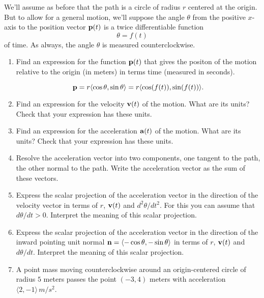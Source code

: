 \documentclass{ximera}
\begin{document}
\begin{question} \label{Q324234fgfg}
We'll assume as before that the path is a circle of radius $r$ centered at the origin. But to allow for a general motion, we'll suppose the angle $\theta$ from the positive $x$-axis to the position vector ${\bf p}(t)$ is a twice differentiable function
\[
   \theta = f(t)
\]
of time. As always, the angle $\theta$ is measured counterclockwise. 

\begin{enumerate}
\item Find an expression for the function ${\bf p}(t)$ that gives the positon of the motion relative to the origin (in meters) in terms time (measured in seconds).

\begin{expandable}
\[
   {\bf p} = r \langle \cos \theta , \sin\theta \rangle = r \langle \cos (f(t)) , \sin (f(t)) \rangle .
\]
\end{expandable}

\item Find an expression for the velocity ${\bf v}(t)$ of the motion. What are its units? Check that your expression has these units.

\item Find an expression for the acceleration ${\bf a}(t)$ of the motion. What are its units? Check that your expression has these units.

\item Resolve the acceleration vector into two components, one tangent to the path, the other normal to the path. Write the acceleration vector as the sum of these vectors.

\item Express the scalar projection of the acceleration vector in the direction of the velocity vector in terms of $r$, ${\bf v}(t)$ and $d^2\theta/dt^2$. For this you can assume that $d\theta / dt>0$. Interpret the meaning of this scalar projection.

\item Express the scalar projection of the acceleration vector in the direction of the inward pointing unit normal ${\bf n} = \langle -\cos\theta, -\sin\theta \rangle$ in terms of $r$, ${\bf v}(t)$ and $d\theta/dt$. Interpret the meaning of this scalar projection.

\item A point mass moving counterclockwise around an origin-centered circle of radius $5$ meters passes the point $(-3,4)$ meters with acceleration $\langle 2, -1\rangle \, m/s^2$.  


\end{enumerate}
\end{question}
\end{document}
